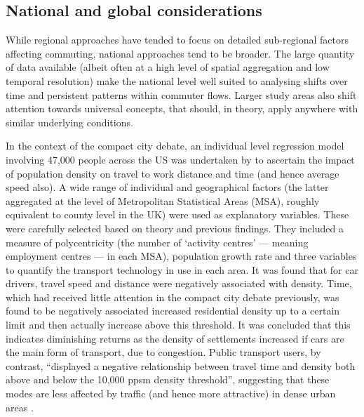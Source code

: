 
\subsection{National and global considerations}
While regional approaches have tended to focus on detailed sub-regional factors
affecting commuting, national approaches tend to be broader. The large
quantity of data available (albeit often at a high level of spatial
aggregation and low temporal resolution) make the national level
well suited to analysing shifts over time and persistent patterns within commuter
flows. Larger study areas also shift attention towards universal concepts,
that should, in theory, apply anywhere with similar underlying conditions.

In the context of the compact city debate, an individual level regression
model involving 47,000 people across the US was undertaken by
\citet{Levtnson1997} to ascertain the impact of population density on
travel to work distance and time (and hence average speed also). A wide range
of individual and geographical
factors (the latter aggregated at the level of Metropolitan Statistical
Areas (MSA), roughly equivalent to county level in the UK) were
used as explanatory variables. These were
carefully selected based on theory and previous findings. They
included a measure of polycentricity (the number of `activity centres' --- meaning
employment centres --- in each MSA), population growth rate and three variables
to quantify the transport technology in use in each area. It was found that for
car drivers, travel speed and distance were negatively associated with density. Time,
which had received little attention in the compact city debate previously, was found to be
negatively associated  increased residential density up to a certain limit
and then actually increase above this threshold. It was concluded that
this indicates diminishing returns as the density of settlements increased 
if cars are the main form of transport, due to congestion. Public
transport users, by contrast, ``displayed a negative relationship between travel
time and density both above and below the 10,000 ppsm density threshold'',
suggesting that these modes are less affected by traffic (and hence more attractive)
in dense urban areas \citep[p.~168]{Levtnson1997}.

